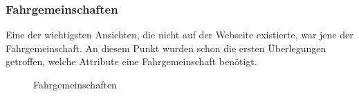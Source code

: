 \subsubsection{Fahrgemeinschaften}\label{mockups_carpools}
Eine der wichtigsten Ansichten, die nicht auf der Webseite existierte, war jene der Fahrgemeinschaft. An diesem Punkt wurden schon die ersten Überlegungen getroffen, welche Attribute eine Fahrgemeinschaft benötigt.
\begin{figure}[ht]
\centering
{}
\label{fig:mockup_carpool}
\caption{Fahrgemeinschaften}
\end{figure}


